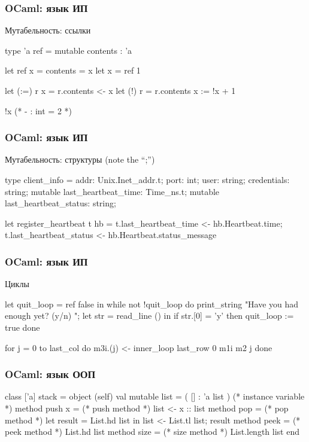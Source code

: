 \begin{frame}[fragile]
  \frametitle{OCaml: язык ИП}

  \large Мутабельность: ссылки
  \footnotesize
  \begin{ocamlcode}
type 'a ref = { mutable contents : 'a }

let ref x = { contents = x }
let x = ref 1

let (:=) r x = r.contents <- x
let (!) r = r.contents
x := !x + 1

!x (* - : int = 2 *)
  \end{ocamlcode}
  \vfill
\end{frame}

\begin{frame}[fragile]
  \frametitle{OCaml: язык ИП}

  \large Мутабельность: структуры (note the ``;'')
  \footnotesize
  \begin{ocamlcode}
type client_info =
 { addr: Unix.Inet_addr.t;
   port: int;
   user: string;
   credentials: string;
   mutable last_heartbeat_time: Time_ns.t;
   mutable last_heartbeat_status: string;
 }

let register_heartbeat t hb =
  t.last_heartbeat_time   <- hb.Heartbeat.time;
  t.last_heartbeat_status <- hb.Heartbeat.status_message
  \end{ocamlcode}
  \vfill
\end{frame}

\begin{frame}[fragile]
  \frametitle{OCaml: язык ИП}

  \large Циклы
  \footnotesize
  \begin{ocamlcode}
let quit_loop = ref false in
while not !quit_loop do
  print_string "Have you had enough yet? (y/n) ";
  let str = read_line () in
  if str.[0] = 'y' then
    quit_loop := true
done

for j = 0 to last_col do
  m3i.(j) <- inner_loop last_row 0 m1i m2 j
done
  \end{ocamlcode}
  \vfill
\end{frame}

\begin{frame}[fragile]
  \frametitle{OCaml: язык ООП}

  \footnotesize
  \begin{ocamlcode}
class ['a] stack =
  object (self)
    val mutable list = ( [] : 'a list )  (* instance variable *)
    method push x =                      (* push method *)
      list <- x :: list
    method pop =                         (* pop method *)
      let result = List.hd list in
      list <- List.tl list;
      result
    method peek =                        (* peek method *)
      List.hd list
    method size =                        (* size method *)
      List.length list
  end
  \end{ocamlcode}
  \vfill
\end{frame}

